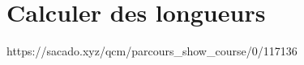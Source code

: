 

% 
% 

% 






\chapter{Calculer des longueurs}
{https://sacado.xyz/qcm/parcours_show_course/0/117136}


